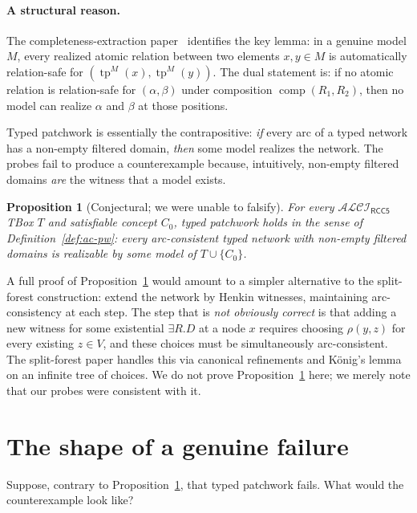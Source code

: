 \documentclass[11pt]{article}
\newtheorem{proposition}[theorem]{Proposition}
\theoremstyle{definition}
\theoremstyle{remark}
\newcommand{\tp}{\operatorname{tp}}
\newcommand{\comp}{\operatorname{comp}}
\newcommand{\ALCIRCC}[1]{\mathcal{ALCI}_{\mathsf{RCC#1}}}
\begin{document}
\paragraph{A structural reason.}
The completeness-extraction paper~\cite{CompletenessExtraction}
identifies the key lemma: in a genuine model $M$, every realized
atomic relation between two elements $x, y \in M$ is automatically
relation-safe for $(\tp^M(x), \tp^M(y))$.  The dual statement is:
if no atomic relation is relation-safe for $(\alpha, \beta)$
under composition $\comp(R_1, R_2)$, then no model can realize
$\alpha$ and $\beta$ at those positions.

Typed patchwork is essentially the contrapositive: \emph{if} every
arc of a typed network has a non-empty filtered domain, \emph{then}
some model realizes the network.  The probes fail to produce a
counterexample because, intuitively, non-empty filtered domains
\emph{are} the witness that a model exists.

\begin{proposition}[Conjectural; we were unable to falsify]
\label{prop:conjecture}
For every $\ALCIRCC{5}$ TBox $T$ and satisfiable concept $C_0$,
typed patchwork holds in the sense of
Definition~\ref{def:ac-pw}: every arc-consistent typed network
with non-empty filtered domains is realizable by some model of
$T \cup \{C_0\}$.
\end{proposition}

A full proof of Proposition~\ref{prop:conjecture} would amount to
a simpler alternative to the split-forest construction: extend the
network by Henkin witnesses, maintaining arc-consistency at each
step.  The step that is \emph{not obviously correct} is that
adding a new witness for some existential $\exists R.D$ at a node
$x$ requires choosing $\rho(y, z)$ for every existing $z \in V$,
and these choices must be simultaneously arc-consistent.  The
split-forest paper handles this via canonical refinements and
König's lemma on an infinite tree of choices.  We do not prove
Proposition~\ref{prop:conjecture} here; we merely note that our
probes were consistent with it.

\section{The shape of a genuine failure}
\label{sec:shape}

Suppose, contrary to Proposition~\ref{prop:conjecture}, that
typed patchwork fails.  What would the counterexample look like?
\end{document}
